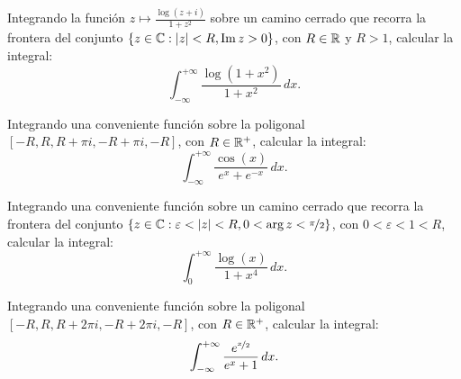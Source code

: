 \begin{ejercicio}
    Integrando la función $z \mapsto \frac{\log(z + i)}{1 + z^2}$ sobre un camino cerrado que recorra la frontera del conjunto $\{z \in \mathbb{C} : |z| < R, \operatorname{Im} z > 0\}$, con $R \in \mathbb{R}$ y $R > 1$, calcular la integral:
    \begin{equation*}
        \int_{-\infty}^{+\infty} \frac{\log(1 + x^2)}{1 + x^2} \, dx.
    \end{equation*}
\end{ejercicio}

\begin{ejercicio}
    Integrando una conveniente función sobre la poligonal $[-R, R, R + \pi i, -R + \pi i, -R]$, con $R \in \mathbb{R}^+$, calcular la integral:
    \begin{equation*}
        \int_{-\infty}^{+\infty} \frac{\cos(x)}{e^x + e^{-x}} \, dx.
    \end{equation*}
\end{ejercicio}

\begin{ejercicio}
    Integrando una conveniente función sobre un camino cerrado que recorra la frontera del conjunto $\{z \in \mathbb{C} : \varepsilon < |z| < R, 0 < \arg z < \nicefrac{\pi}{2}\}$, con $0 < \varepsilon < 1 < R$, calcular la integral:
    \begin{equation*}
        \int_0^{+\infty} \frac{\log(x)}{1 + x^4} \, dx.
    \end{equation*}
\end{ejercicio}

\begin{ejercicio}
    Integrando una conveniente función sobre la poligonal $[-R, R, R + 2\pi i, -R + 2\pi i, -R]$, con $R \in \mathbb{R}^+$, calcular la integral:
    \begin{equation*}
        \int_{-\infty}^{+\infty} \frac{e^{\nicefrac{x}{2}}}{e^x + 1} \, dx.
    \end{equation*}
\end{ejercicio}